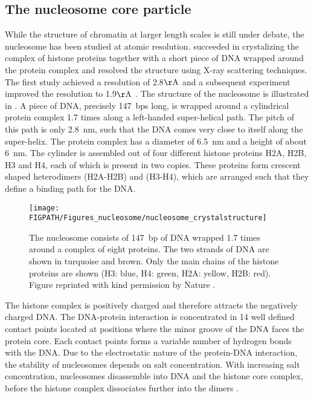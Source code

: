 \subsection{\label{sec:nuc_structure}The nucleosome core particle}
While the structure of chromatin at larger length scales is still under debate, the nucleosome
 has been studied at atomic resolution. \citeauthor{Luger_Nature_97} succeeded 
in crystalizing the complex of histone proteins together with a short piece of DNA  wrapped around 
the protein complex 	and resolved the structure using X-ray scattering techniques. The first study achieved
a resolution of 2.8$\Ang$ \cite{Luger_Nature_97} and a subsequent experiment improved the resolution
to 1.9$\Ang$ \cite{Davey_JMB_02}. The structure of the nucleosome is illustrated in .
A piece of DNA, precisely 147~bps long, is wrapped around a cylindrical protein complex 1.7 times along 
a left-handed super-helical path. The pitch of this path is only 2.8~nm, such that the DNA comes very close
to itself along the super-helix. The protein complex has a diameter
of 6.5~nm and a height of about 6~nm. The cylinder is assembled out of four different  histone proteins
H2A, H2B, H3 and H4, each of which is present in two copies. 
These proteins form crescent shaped heterodimers (H2A-H2B) and (H3-H4), 
which are arranged such that they define a binding path for the DNA. 
\begin{figure}
\centering
\texttt{[image: \\FIGPATH/Figures\_nucleosome/nucleosome\_crystalstructure]}
\caption[Crystal structure of Nucleosomes]{\label{fig:nuc_structure} The nucleosome consists of 147~bp of DNA wrapped 1.7 times around
a complex of eight proteins. The two strands of DNA are shown in turquoise and brown. Only the 
main chains of the histone proteins are shown (H3: blue, H4: green, H2A: yellow, H2B: red).
Figure reprinted with kind permission by Nature \cite{Luger_Nature_97}.}
\end{figure}
The histone complex is positively charged and therefore attracts the negatively charged DNA. 
The DNA-protein interaction is concentrated in 14 well defined contact points located at positions where the minor 
groove of the DNA faces the protein core. Each contact points forms a variable number of hydrogen bonds with the
DNA. Due to the electrostatic nature of the protein-DNA interaction, 
the stability of nucleosomes depends on salt concentration.
With increasing salt concentration, nucleosomes disassemble into DNA and the histone core complex, before
the histone complex dissociates further into the dimers \cite{Schiessel_JPhysCondMat_03}.

